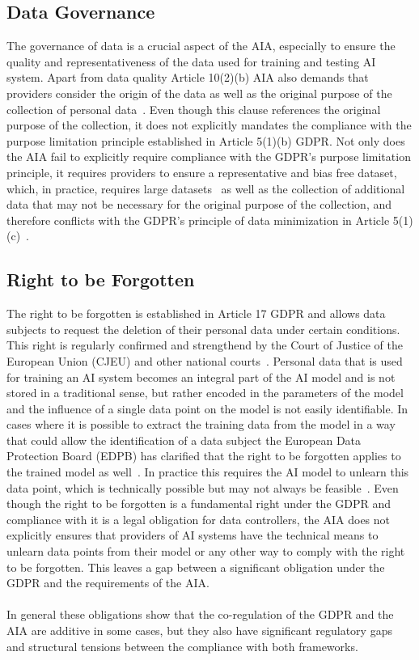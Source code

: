 \documentclass[
	a4paper, %
	10pt, %
	unnumberedsections, %
	twoside, %
]{LTJournalArticle}
\begin{document}
\subsection{Data Governance}
The governance of data is a crucial aspect of the AIA, especially to ensure the quality and representativeness of the data used for training and testing AI system. Apart from data quality Article 10(2)(b) AIA also demands that providers consider the origin of the data
as well as the original purpose of the collection of personal data~\cite{euaiact2024}. Even though this clause references the original purpose of the collection, it does not explicitly mandates the compliance with the purpose limitation principle 
established in Article 5(1)(b) GDPR. Not only does the AIA fail to explicitly require compliance with the GDPR's purpose limitation principle, it requires providers to ensure a representative and bias free dataset, which, in practice,
requires large datasets~\cite{Samuel2021Distributional} as well as the collection of additional data that may not be necessary for the original purpose of the collection, and therefore conflicts with the GDPR's principle of data minimization in Article 5(1)(c)~\cite{eugdpr2016}.

\subsection{Right to be Forgotten}
The right to be forgotten is established in Article 17 GDPR and allows data subjects to request the deletion of their personal data under certain conditions. This right is regularly confirmed and strengthend by the Court of Justice of the European Union (CJEU) and other
national courts~\cite{googlespain2014,Kazemi2018}. Personal data that is used for training an AI system becomes an integral part of the AI model and is not stored in a traditional sense, but rather encoded in the parameters of the model and the influence of a single data
point on the model is not easily identifiable. In cases where it is possible to extract the training data from the model in a way that could allow the identification of a data subject the European Data Protection Board (EDPB) has clarified that the right to be 
forgotten applies to the trained model as well~\cite{edpb}. In practice this requires the AI model to unlearn this data point, which is technically possible but may not always be feasible~\cite{Velli2025,JuliussenRuiJohansen2023}.
Even though the right to be forgotten is a fundamental right under the GDPR and compliance with it is a legal obligation for data controllers, the AIA does not explicitly ensures that providers of AI systems have the technical means to unlearn data points from their
model or any other way to comply with the right to be forgotten. This leaves a gap between a significant obligation under the GDPR and the requirements of the AIA.\\
\\
In general these obligations show that the co-regulation of the GDPR and the AIA are additive in some cases, but they also have significant regulatory gaps and structural tensions between the compliance with both frameworks.\\
\end{document}
